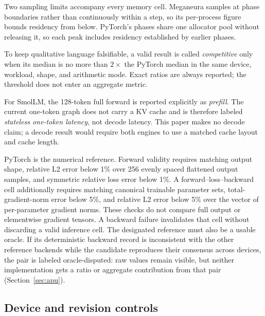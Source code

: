 \documentclass[10pt,twocolumn]{article}
\newcommand{\system}{Meganeura}
\begin{document}
Two sampling limits accompany every memory cell. \system{} samples at phase
boundaries rather than continuously within a step, so its per-process figure
bounds residency from below. PyTorch's phases share one allocator pool
without releasing it, so each peak includes residency established by earlier
phases.

To keep qualitative language falsifiable, a valid result is called
\textit{competitive} only when its median is no more than $2\times$ the
PyTorch median in the same device, workload, shape, and arithmetic mode.
Exact ratios are always reported; the threshold does not enter an aggregate
metric.

For SmolLM, the 128-token full forward is reported explicitly as
\textit{prefill}. The current one-token graph does not carry a KV cache and is
therefore labeled \textit{stateless one-token latency}, not decode latency.
This paper makes no decode claim; a decode result would require both engines
to use a matched cache layout and cache length.

PyTorch is the numerical reference. Forward validity requires matching output
shape, relative L2 error below 1\% over 256 evenly spaced flattened output
samples, and symmetric relative loss error
below 1\%. A forward--loss--backward cell additionally requires matching
canonical trainable parameter sets, total-gradient-norm error below 5\%, and
relative L2 error below 5\% over the vector of per-parameter gradient norms.
These checks do not compare full output or elementwise gradient tensors. A
backward failure invalidates that cell without discarding a valid inference
cell. The designated reference must also be a usable oracle. If its
deterministic backward record is inconsistent with the other reference
backends while the candidate reproduces their consensus across devices, the
pair is labeled oracle-disputed: raw values remain visible, but neither
implementation gets a ratio or aggregate contribution from that pair
(Section~\ref{sec:apu}).

\subsection{Device and revision controls}
\end{document}
